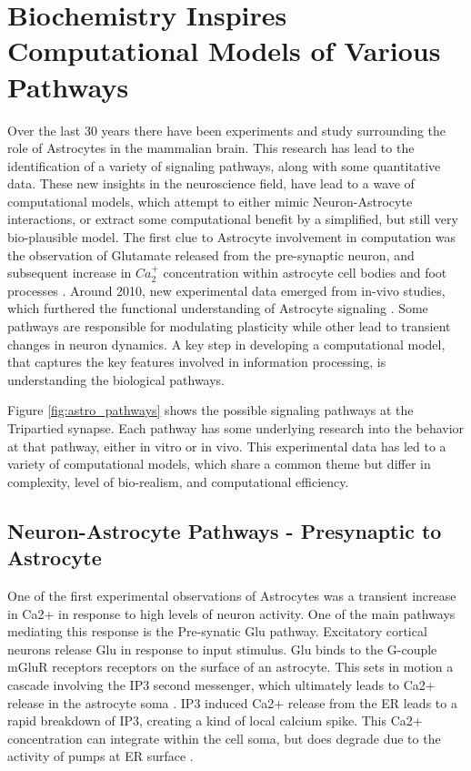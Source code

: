 

    \section{Biochemistry Inspires Computational Models of Various Pathways}
    Over the last 30 years there have been experiments and study surrounding the
    role of Astrocytes in the mammalian brain. This research has lead to the
    identification of a variety of signaling pathways, along with some
    quantitative data. These new insights in the neuroscience field, have lead
    to a wave of computational models, which attempt to either mimic
    Neuron-Astrocyte interactions, or extract some computational benefit by a
    simplified, but still very bio-plausible model. The first clue to Astrocyte
    involvement in computation was the observation of Glutamate released from
    the pre-synaptic neuron, and subsequent increase in $Ca_2^+$ concentration
    within astrocyte cell bodies and foot processes \cite{manninen_2018}. Around
    2010, new experimental data emerged from in-vivo studies, which furthered
    the functional understanding of Astrocyte signaling
    \cite{manninen_2018}. Some pathways are responsible for modulating
    plasticity while other lead to transient changes in neuron dynamics. A key
    step in developing a computational model, that captures the key features
    involved in information processing, is understanding the biological
    pathways.

    
    Figure \ref{fig:astro_pathways} shows the possible signaling pathways at the
    Tripartied synapse. Each pathway has some underlying research into the
    behavior at that pathway, either in vitro or in vivo. This experimental data
    has led to a variety of computational models, which share a common theme but
    differ in complexity, level of bio-realism, and computational efficiency.


    \subsection{Neuron-Astrocyte Pathways - Presynaptic to Astrocyte}

    One of the first experimental observations of Astrocytes was a transient
    increase in Ca2+ in response to high levels of neuron activity. One of the
    main pathways mediating this response is the Pre-synatic Glu
    pathway. Excitatory cortical neurons release Glu in response to input
    stimulus. Glu binds to the G-couple mGluR receptors receptors on the surface
    of an astrocyte. This sets in motion a cascade involving the IP3 second
    messenger, which ultimately leads to Ca2+ release in the astrocyte soma
    \cite{pitta_2012}. IP3 induced Ca2+ release from the ER leads to a rapid
    breakdown of IP3, creating a kind of local calcium spike. This Ca2+
    concentration can integrate within the cell soma, but does degrade due to
    the activity of pumps at ER surface \cite{pitta_2012}.

